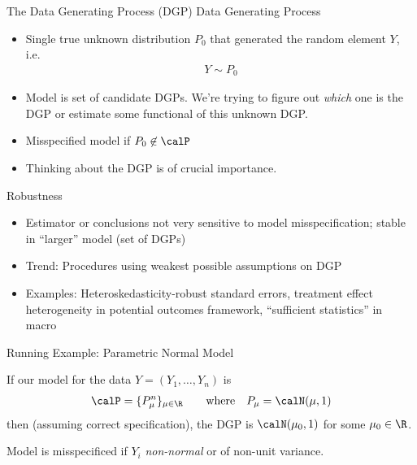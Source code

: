 \documentclass[aspectratio=169, handout]{beamer}
\begin{document}
{\footnotesize
\begin{frame}{The Data Generating Process (DGP)}
Data Generating Process
\begin{itemize}
  \item
    Single \alert{true} unknown distribution $P_0$ that
    \alert{generated} the random element $Y$, i.e.
    \begin{align*}
      Y\sim P_0
    \end{align*}

  \pause

  \item Model is set of candidate DGPs.
    We're trying to figure out \emph{which} one is the DGP or estimate
    some functional of this unknown DGP.

  \pause
  \item \alert{Misspecified} model if $P_0\not\in\calP$

  \item Thinking about the DGP is of \alert{crucial importance}.

\end{itemize}
Robustness
\begin{itemize}
  \item
    Estimator or conclusions not very sensitive to model
    misspecification; \alert{stable} in ``larger'' model (set of DGPs)

  \pause

  \item Trend: Procedures using \alert{weakest possible}
    assumptions on DGP

  \pause
  \item
    Examples:
    Heteroskedasticity-robust standard errors,
    treatment effect heterogeneity in potential outcomes framework,
    ``sufficient statistics'' in macro
\end{itemize}
\end{frame}
}


{\footnotesize
\begin{frame}{Running Example: Parametric Normal Model}

If our model for the data $Y=(Y_1,\ldots,Y_n)$ is
\begin{align*}
  \calP = \{P_\mu^n\}_{\mu\in \R}
  \qquad\text{where}\quad
  P_\mu = \calN(\mu,1)
\end{align*}
then (assuming correct specification), the DGP is $\calN(\mu_0,1)$ for
some $\mu_0\in\R$.

\pause
Model is misspecificed if $Y_i$ \emph{non-normal} or of non-unit
variance.

\end{frame}
}
\end{document}
